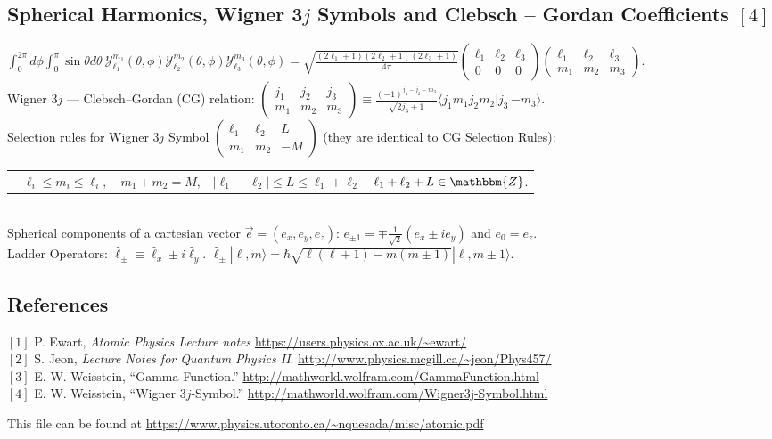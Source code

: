 \documentclass[english,11pt]{shreyasnotes}
\begin{document}
\subsection*{Spherical Harmonics, Wigner 3$j$ Symbols and Clebsch -- Gordan Coefficients $[4]$}
$\int_0^{2 \pi} d\phi \int_0^{\pi} \sin \theta d\theta \ \mathcal{Y}_{\ell_1}^{m_1}(\theta,\phi) \mathcal{Y}_{\ell_2}^{m_2}(\theta,\phi) \mathcal{Y}_{\ell_3}^{m_3}(\theta,\phi)=\sqrt{\frac{(2\ell_1+1)(2\ell_2+1)(2\ell_3+1)}{4 \pi}} \begin{pmatrix}
  \ell_1 & \ell_2 & \ell_3\\
  0 & 0 & 0
\end{pmatrix}
\begin{pmatrix}
  \ell_1 & \ell_2 & \ell_3\\
  m_1 & m_2 & m_3
\end{pmatrix}
$.
\\

\noindent Wigner 3$j$ --- Clebsch--Gordan (CG) relation:
$
\begin{pmatrix}
  j_1 & j_2 & j_3\\
  m_1 & m_2 & m_3
\end{pmatrix}
\equiv \frac{(-1)^{j_1-j_2-m_3}}{\sqrt{2j_3+1}} \langle j_1 m_1 j_2 m_2 | j_3 \, {-m_3} \rangle.$\\

\noindent Selection rules for Wigner 3$j$ Symbol $\begin{pmatrix}  \ell_1 & \ell_2 & L\\   m_1 & m_2 & -M \end{pmatrix}$ (they are identical to CG Selection Rules):

\noindent 
\begin{tabular}{llll}
$-\ell_i \leq m_i \leq \ell_i, $ & $m_1+m_2=M$, & $|\ell_1-\ell_2|\leqslant L \leqslant \ell_1+\ell_2$ & $\ell_1+\ell_2+L \in \mathbbm{Z}$.
\end{tabular}
\\

\noindent Spherical components of a cartesian vector $\vec e=(e_x,e_y,e_z)$: $e_{\pm 1}=\mp \frac{1}{\sqrt{2}} \left( e_x\pm i e_y \right)$ and $e_0=e_z$.\\

\noindent Ladder Operators: $ \hat \ell_{\pm}\equiv \hat \ell_x\pm i \hat \ell_y$. \space \space \space $\hat \ell_{\pm} |\ell,m \rangle=\hbar \sqrt{\ell(\ell+1)-m(m\pm1)}|\ell,m\pm1 \rangle$.

\subsection*{References}
$[1]$ P. Ewart, \textit{Atomic Physics Lecture notes} \url{https://users.physics.ox.ac.uk/~ewart/}\\
$[2]$ S. Jeon, \textit{Lecture Notes for Quantum Physics II}. \url{http://www.physics.mcgill.ca/~jeon/Phys457/}\\
$[3]$ E. W. Weisstein, ``Gamma Function.'' \url{http://mathworld.wolfram.com/GammaFunction.html}\\
$[4]$ E. W. Weisstein, ``Wigner 3$j$-Symbol.'' \url{http://mathworld.wolfram.com/Wigner3j-Symbol.html}

\begin{center}
{\tiny This file can be found at \url{https://www.physics.utoronto.ca/~nquesada/misc/atomic.pdf} }
\end{center}
\end{document}
